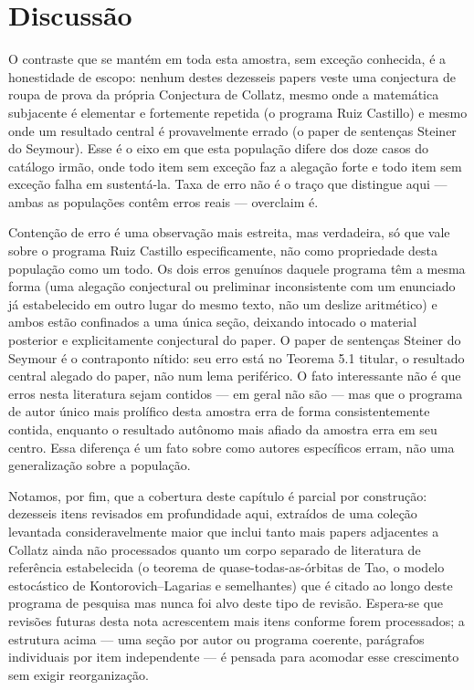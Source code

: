 \documentclass[11pt]{article}
\begin{document}
\section{Discussão}
\label{sec:discussion}

O contraste que se mantém em toda esta amostra, sem exceção conhecida,
é a honestidade de escopo: nenhum destes dezesseis papers veste uma
conjectura de roupa de prova da própria Conjectura de Collatz, mesmo
onde a matemática subjacente é elementar e fortemente repetida (o
programa Ruiz Castillo) e mesmo onde um resultado central é
provavelmente errado (o paper de sentenças Steiner do Seymour). Esse é
o eixo em que esta população difere dos doze casos do catálogo irmão,
onde todo item sem exceção faz a alegação forte e todo item sem exceção
falha em sustentá-la. Taxa de erro não é o traço que distingue aqui ---
ambas as populações contêm erros reais --- overclaim é.

Contenção de erro é uma observação mais estreita, mas verdadeira, só
que vale sobre o programa Ruiz Castillo especificamente, não como
propriedade desta população como um todo. Os dois erros genuínos
daquele programa têm a mesma forma (uma alegação conjectural ou
preliminar inconsistente com um enunciado já estabelecido em outro
lugar do mesmo texto, não um deslize aritmético) e ambos estão
confinados a uma única seção, deixando intocado o material posterior e
explicitamente conjectural do paper. O paper de sentenças Steiner do
Seymour é o contraponto nítido: seu erro está no Teorema 5.1 titular, o
resultado central alegado do paper, não num lema periférico. O fato
interessante não é que erros nesta literatura sejam contidos --- em
geral não são --- mas que o programa de autor único mais prolífico
desta amostra erra de forma consistentemente contida, enquanto o
resultado autônomo mais afiado da amostra erra em seu centro. Essa
diferença é um fato sobre como autores específicos erram, não uma
generalização sobre a população.

Notamos, por fim, que a cobertura deste capítulo é parcial por
construção: dezesseis itens revisados em profundidade aqui, extraídos
de uma coleção levantada consideravelmente maior que inclui tanto mais
papers adjacentes a Collatz ainda não processados quanto um corpo
separado de literatura de referência estabelecida (o teorema de
quase-todas-as-órbitas de Tao, o modelo estocástico de Kontorovich--Lagarias
e semelhantes) que é citado ao longo deste programa de pesquisa mas
nunca foi alvo deste tipo de revisão. Espera-se que revisões futuras
desta nota acrescentem mais itens conforme forem processados; a
estrutura acima --- uma seção por autor ou programa coerente,
parágrafos individuais por item independente --- é pensada para
acomodar esse crescimento sem exigir reorganização.
\end{document}
